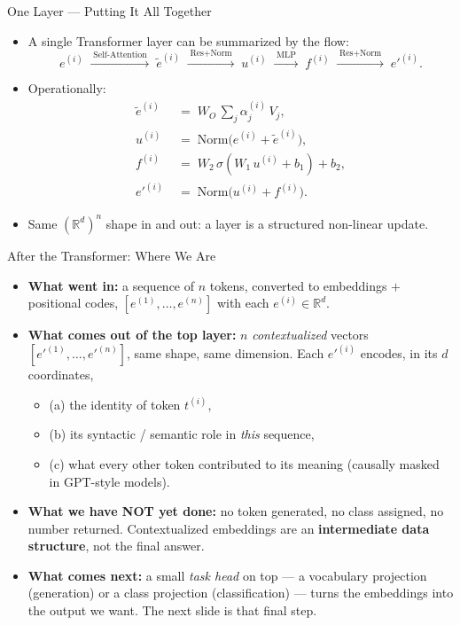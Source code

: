\begin{frame}{One Layer --- Putting It All Together}
\begin{itemize}
\item A single Transformer layer can be summarized by the flow:
\[
   e^{(i)} \;\xrightarrow{\;\text{Self-Attention}\;}\; \tilde{e}^{(i)}
   \;\xrightarrow{\;\text{Res+Norm}\;}\; u^{(i)}
   \;\xrightarrow{\;\text{MLP}\;}\; f^{(i)}
   \;\xrightarrow{\;\text{Res+Norm}\;}\; e'^{(i)}.
\]

\medskip
\item Operationally:
\[
   \begin{aligned}
       \tilde{e}^{(i)} &\;=\; W_{O}\,\sum_{j} \alpha_{j}^{(i)}\,V_{j}, \\[2pt]
       u^{(i)} &\;=\; \mathrm{Norm}\bigl(e^{(i)} + \tilde{e}^{(i)}\bigr), \\[2pt]
       f^{(i)} &\;=\; W_{2}\,\sigma(W_{1}\,u^{(i)} + b_{1}) + b_{2}, \\[2pt]
       e'^{(i)} &\;=\; \mathrm{Norm}\bigl(u^{(i)} + f^{(i)}\bigr).
   \end{aligned}
\]

\medskip
\item Same $(\mathbb{R}^d)^n$ shape in and out: a layer is a structured non-linear update.
\end{itemize}
\end{frame}

\begin{frame}{After the Transformer: Where We Are}
\begin{itemize}
\item \textbf{What went in:} a sequence of $n$ tokens, converted to embeddings $+$ positional codes, $[e^{(1)}, \ldots, e^{(n)}]$ with each $e^{(i)} \in \mathbb{R}^{d}$.

\medskip
\item \textbf{What comes out of the top layer:} $n$ \emph{contextualized} vectors $[e'^{(1)}, \ldots, e'^{(n)}]$, same shape, same dimension. Each $e'^{(i)}$ encodes, in its $d$ coordinates,
\begin{itemize}
    \item (a) the identity of token $t^{(i)}$,
    \item (b) its syntactic / semantic role in \emph{this} sequence,
    \item (c) what every other token contributed to its meaning (causally masked in GPT-style models).
\end{itemize}

\medskip
\item \textbf{What we have NOT yet done:} no token generated, no class assigned, no number returned. Contextualized embeddings are an \textbf{intermediate data structure}, not the final answer.

\medskip
\item \textbf{What comes next:} a small \emph{task head} on top --- a vocabulary projection (generation) or a class projection (classification) --- turns the embeddings into the output we want. The next slide is that final step.
\end{itemize}
\end{frame}

